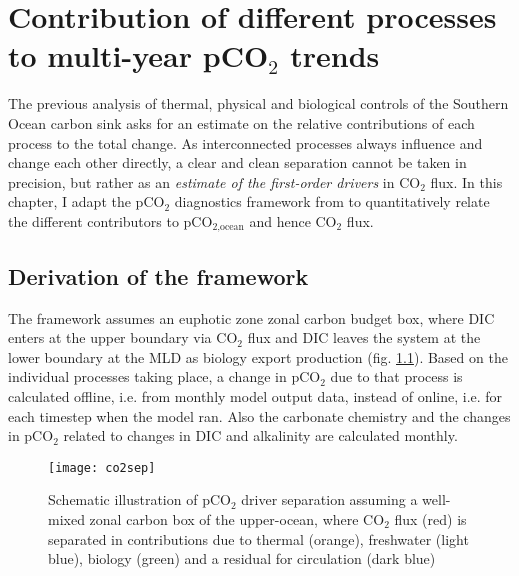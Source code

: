 \chapter{Contribution of different processes to multi-year pCO$_2$ trends} %
%
\label{ch:pCO2separation}

The previous analysis of thermal, physical and biological controls of the Southern Ocean carbon sink asks for an estimate on the relative contributions of each process to the total change. As interconnected processes always influence and change each other directly, a clear and clean separation cannot be taken in precision, but rather as an \textit{estimate of the first-order drivers} in CO$_2$ flux. In this chapter, I adapt the pCO$_2$ diagnostics framework from \cite{Lovenduski2007} to quantitatively relate the different contributors to pCO$_{\text{2,ocean}}$ and hence CO$_2$ flux.

\section{Derivation of the framework}
The framework assumes an euphotic zone zonal carbon budget box, where \acs{DIC} enters at the upper boundary  via CO$_2$ flux and \acs{DIC} leaves the system at the lower boundary at the \acs{MLD} as biology export production  (fig. \ref{fig:pCO2_separation}). Based on the individual processes taking place, a change in pCO$_2$ due to that process is calculated offline, i.e. from monthly model output data, instead of online, i.e. for each timestep when the model ran. Also the carbonate chemistry and the changes in pCO$_2$ related to changes in \acs{DIC} and alkalinity are calculated monthly. \newline

\begin{figure}[h!]
	\centering
	\texttt{[image: co2sep]}
	\caption{Schematic illustration of pCO$_2$ driver separation assuming a well-mixed zonal carbon box of the upper-ocean, where CO$_2$ flux (red) is separated in contributions due to thermal (orange), freshwater (light blue), biology (green) and a residual for circulation (dark blue)}	
	\label{fig:pCO2_separation}
\end{figure}

